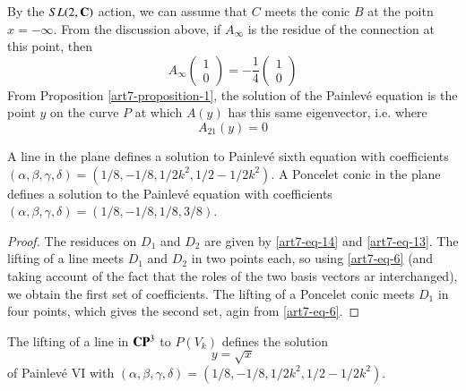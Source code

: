 \begin{remark*}
By the $SL(2, \mathbf{C})$ action, we can assume that $C$ meets the conic $B$ at the poitn $x=-\infty$. From the discussion above, if $A_{\infty}$ is the residue of the connection at this point, then
$$
A_{\infty}
\left(
\begin{matrix}
1\\
0
\end{matrix}
\right) 
= -\dfrac{1}{4}
\left(
\begin{matrix}
1\\
0
\end{matrix}
\right) 
$$
From Proposition \ref{art7-proposition-1}, the solution of the Painlev\'e equation is the point $y$ on the curve $P$ at which $A(y)$ has this same eigenvector, i.e. where
$$
A_{21}(y)=0
$$
\end{remark*}

\begin{proposition}\label{art7-proposition-5}
A line in the plane defines a solution to Painlev\'e sixth equation with coefficients $(\alpha, \beta, \gamma, \delta) = (1/8, -1/8,1/2k^{2},1/2-1/2k^{2})$. A Poncelet conic in the plane defines a solution to the Painlev\'e equation with coefficients $(\alpha, \beta,\gamma, \delta) = (1/8, -1/8, 1/8, 3/8)$.
\end{proposition}

\begin{proof}
The residuces on $D_{1}$ and $D_{2}$ are given by \eqref{art7-eq-14} and \eqref{art7-eq-13}. The lifting of a line meets $D_{1}$ and $D_{2}$ in two points each, so using \eqref{art7-eq-6} (and taking account of the fact that the roles of the two basis vectors ar interchanged), we obtain the first set of coefficients. The lifting of a Poncelet conic meets $D_{1}$ in  four points, which gives the second set, agin from \eqref{art7-eq-6}.
\end{proof}

\begin{proposition}\label{art7-proposition-6}
The lifting of a line in $\mathbf{C}\mathbf{P}^{3}$ to $P(V_{k})$ defines the solution
$$
y = \sqrt{x}
$$
of Painlev\'e VI with $(\alpha, \beta, \gamma, \delta)= (1/8,-1/8, 1/2k^{2},1/2-1/2k^{2})$.
\end{proposition}

